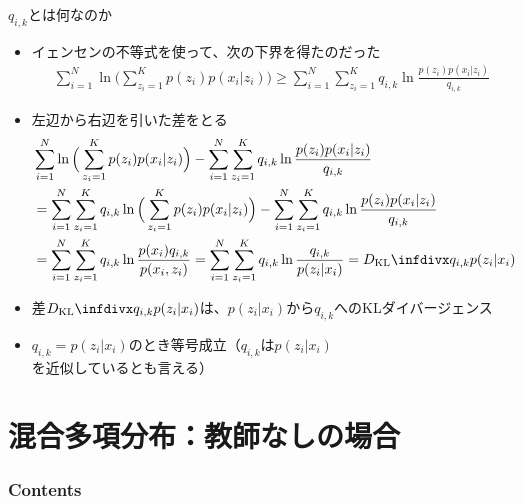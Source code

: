 \documentclass[aspectratio=169,unicode,dvipdfmx,14pt]{beamer}
\begin{document}
\begin{frame}{$q_{i,k}$とは何なのか}
\FontMath
\vspace{-.05in}
\begin{itemize}
\item イェンセンの不等式を使って、次の下界を得たのだった
\vspace{-.05in}
\begin{align}
\sum_{i=1}^N \ln \Big( \sum_{z_i=1}^K p(z_i) p(x_i | z_i) \Big)
\geq 
\sum_{i=1}^N \sum_{z_i=1}^K q_{i,k} \ln\frac{p(z_i) p(x_i | z_i)}{q_{i,k}}
\end{align}
\item 左辺から右辺を引いた差をとる
\vspace{-.05in}
\begin{align}
& \sum_{i=1}^N \ln \Big( \sum_{z_i=1}^K p(z_i) p(x_i | z_i) \Big)
- \sum_{i=1}^N \sum_{z_i=1}^K q_{i,k} \ln\frac{p(z_i) p(x_i | z_i)}{q_{i,k}}
\notag \\ &
= \sum_{i=1}^N \sum_{z_i=1}^K q_{i,k} \ln \Big( \sum_{z_i=1}^K p(z_i) p(x_i | z_i) \Big)
- \sum_{i=1}^N \sum_{z_i=1}^K q_{i,k} \ln\frac{p(z_i) p(x_i | z_i)}{q_{i,k}}
\notag \\ &
= \sum_{i=1}^N \sum_{z_i=1}^K q_{i,k} \ln \frac{p(x_i) q_{i,k}}{p(x_i , z_i)}
= \sum_{i=1}^N \sum_{z_i=1}^K q_{i,k} \ln \frac{q_{i,k}}{p(z_i | x_i)}
= \infdiv{q_{i,k}}{p(z_i | x_i)}
\end{align}
\item 差$\infdiv{q_{i,k}}{p(z_i | x_i)}$は、$p(z_i | x_i)$から$q_{i,k}$へのKLダイバージェンス
\item $q_{i,k}=p(z_i | x_i)$のとき等号成立（$q_{i,k}$は$p(z_i | x_i)$を近似しているとも言える）
\end{itemize}
\end{frame}

\section{混合多項分布：教師なしの場合}

\begin{frame}\frametitle{Contents}
\Large \tableofcontents[currentsection]
\end{frame}
\end{document}
